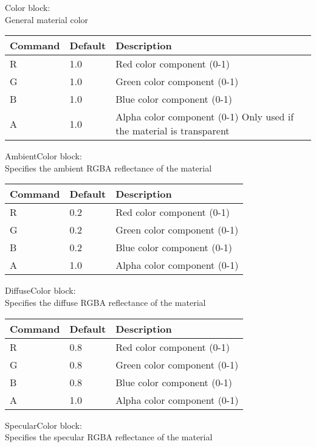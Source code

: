 Color block:\\
General material color\\

\begin{tabular}{|p{2.5cm}|p{2.5cm}|p{9cm}|}
\hline
\textbf{Command} & \textbf{Default} & \textbf{Description}\\
\hline
R & 1.0 & Red color component (0-1)\\
G & 1.0 & Green color component (0-1)\\
B & 1.0 & Blue color component (0-1)\\
A & 1.0 & Alpha color component (0-1)\newline
		  Only used if the material is transparent\\
\hline
\end{tabular}


AmbientColor block:\\
Specifies the ambient RGBA reflectance of the material\\

\begin{tabular}{|p{2.5cm}|p{2.5cm}|p{9cm}|}
\hline
\textbf{Command} & \textbf{Default} & \textbf{Description}\\
\hline
R & 0.2 & Red color component (0-1)\\
G & 0.2 & Green color component (0-1)\\
B & 0.2 & Blue color component (0-1)\\
A & 1.0 & Alpha color component (0-1)\\
\hline
\end{tabular}


DiffuseColor block:\\
Specifies the diffuse RGBA reflectance of the material\\

\begin{tabular}{|p{2.5cm}|p{2.5cm}|p{9cm}|}
\hline
\textbf{Command} & \textbf{Default} & \textbf{Description}\\
\hline
R & 0.8 & Red color component (0-1)\\
G & 0.8 & Green color component (0-1)\\
B & 0.8 & Blue color component (0-1)\\
A & 1.0 & Alpha color component (0-1)\\
\hline
\end{tabular}


SpecularColor block:\\
Specifies the specular RGBA reflectance of the material\\

